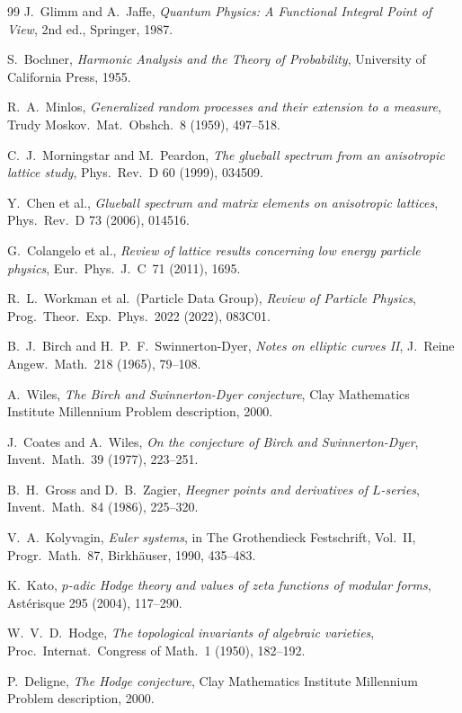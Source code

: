 \documentclass[11pt,a4paper]{amsart}
\theoremstyle{plain}
\theoremstyle{definition}
\begin{document}
\begin{thebibliography}{99}
 J.~Glimm and A.~Jaffe, \emph{Quantum Physics: A
Functional Integral Point of View}, 2nd ed., Springer, 1987.

 S.~Bochner, \emph{Harmonic Analysis and the Theory
of Probability}, University of California Press, 1955.

 R.~A.~Minlos, \emph{Generalized random processes and
their extension to a measure}, Trudy Moskov.~Mat.~Obshch.~8 (1959),
497--518.

 C.~J.~Morningstar and M.~Peardon,
\emph{The glueball spectrum from an anisotropic lattice study},
Phys.~Rev.~D 60 (1999), 034509.

 Y.~Chen et al., \emph{Glueball spectrum and matrix
elements on anisotropic lattices}, Phys.~Rev.~D 73 (2006), 014516.

 G.~Colangelo et al., \emph{Review of lattice
results concerning low energy particle physics},
Eur.~Phys.~J.~C~71 (2011), 1695.

 R.~L.~Workman et al.~(Particle Data Group),
\emph{Review of Particle Physics}, Prog.~Theor.~Exp.~Phys.~2022 (2022),
083C01.

 B.~J.~Birch and H.~P.~F.~Swinnerton-Dyer, \emph{Notes
on elliptic curves II}, J.~Reine Angew.~Math.~218 (1965), 79--108.

 A.~Wiles, \emph{The Birch and Swinnerton-Dyer
conjecture}, Clay Mathematics Institute Millennium Problem description,
2000.

 J.~Coates and A.~Wiles, \emph{On the conjecture of
Birch and Swinnerton-Dyer}, Invent.~Math.~39 (1977), 223--251.

 B.~H.~Gross and D.~B.~Zagier, \emph{Heegner points
and derivatives of $L$-series}, Invent.~Math.~84 (1986), 225--320.

 V.~A.~Kolyvagin, \emph{Euler systems}, in
The Grothendieck Festschrift, Vol.~II, Progr.~Math.~87, Birkh\"auser,
1990, 435--483.

 K.~Kato, \emph{$p$-adic Hodge theory and values of
zeta functions of modular forms}, Ast\'erisque 295 (2004), 117--290.

 W.~V.~D.~Hodge, \emph{The topological invariants of
algebraic varieties}, Proc.~Internat.~Congress of Math.~1 (1950),
182--192.

 P.~Deligne, \emph{The Hodge conjecture}, Clay
Mathematics Institute Millennium Problem description, 2000.


\end{thebibliography}
\end{document}
